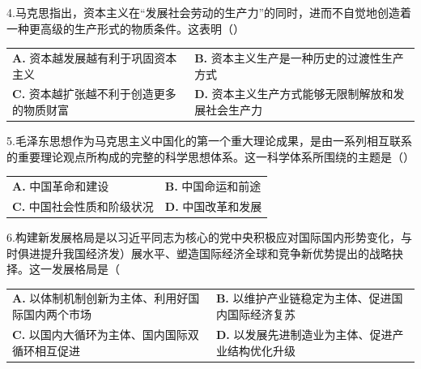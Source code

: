 \documentclass[UTF8,11pt]{ctexart}
\begin{document}
4.马克思指出，资本主义在“发展社会劳动的生产力”的同时，进而不自觉地创造着一种更高级的生产形式的物质条件。这表明（）


\begin{center}\begin{tabular}{>{\raggedright\arraybackslash}p{\dimexpr(\linewidth-4\tabcolsep)/2\relax}>{\raggedright\arraybackslash}p{\dimexpr(\linewidth-4\tabcolsep)/2\relax}}
\textbf{A.} 资本越发展越有利于巩固资本主义 & \textbf{B.} 资本主义生产是一种历史的过渡性生产方式\\[.35em]
\textbf{C.} 资本越扩张越不利于创造更多的物质财富 & \textbf{D.} 资本主义生产方式能够无限制解放和发展社会生产力\\[.35em]\end{tabular}\end{center}

5.毛泽东思想作为马克思主义中国化的第一个重大理论成果，是由一系列相互联系的重要理论观点所构成的完整的科学思想体系。这一科学体系所围绕的主题是（）


\begin{center}\begin{tabular}{>{\raggedright\arraybackslash}p{\dimexpr(\linewidth-4\tabcolsep)/2\relax}>{\raggedright\arraybackslash}p{\dimexpr(\linewidth-4\tabcolsep)/2\relax}}
\textbf{A.} 中国革命和建设 & \textbf{B.} 中国命运和前途\\[.35em]
\textbf{C.} 中国社会性质和阶级状况 & \textbf{D.} 中国改革和发展\\[.35em]\end{tabular}\end{center}

6.构建新发展格局是以习近平同志为核心的党中央积极应对国际国内形势变化，与时俱进提升我国经济发）展水平、塑造国际经济全球和竞争新优势提出的战略抉择。这一发展格局是（


\begin{center}\begin{tabular}{>{\raggedright\arraybackslash}p{\dimexpr(\linewidth-4\tabcolsep)/2\relax}>{\raggedright\arraybackslash}p{\dimexpr(\linewidth-4\tabcolsep)/2\relax}}
\textbf{A.} 以体制机制创新为主体、利用好国际国内两个市场 & \textbf{B.} 以维护产业链稳定为主体、促进国内国际经济复苏\\[.35em]
\textbf{C.} 以国内大循环为主体、国内国际双循环相互促进 & \textbf{D.} 以发展先进制造业为主体、促进产业结构优化升级\\[.35em]\end{tabular}\end{center}
\end{document}

